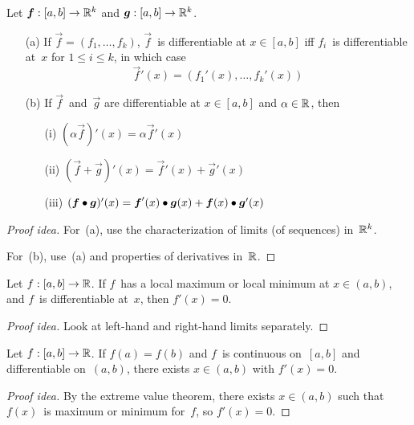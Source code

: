 \begin{thm}[Derivatives in~\(\R^k\)]
Let \(\boldsymbol{f}:[a,b]\to\mathbb{R}^k\) and \(\boldsymbol{g}:[a,b]\to\mathbb{R}^k\).
\begin{enumerate}[itemsep=0pt]
\item[(a)] If \(\vec{f}=(f_1,\ldots,f_k)\), \(\vec{f}\)~is differentiable at \(x\in[a,b]\) iff \(f_i\)~is differentiable at~\(x\) for \(1\le i\le k\), in which case
\[\vec{f}'(x)=(f_1'(x),\ldots,f_k'(x))\]
\item[(b)] If \(\vec{f}\)~and~\(\vec{g}\) are differentiable at \(x\in[a,b]\) and \(\alpha\in\mathbb{R}\), then
\begin{enumerate}[itemsep=0pt]
\item[(i)] \((\alpha\vec{f})'(x)=\alpha\vec{f}'(x)\)
\item[(ii)] \((\vec{f}+\vec{g})'(x)=\vec{f}'(x)+\vec{g}'(x)\)
\item[(iii)] \((\boldsymbol{f}\bullet\boldsymbol{g})'(x)=\boldsymbol{f}'(x)\bullet\boldsymbol{g}(x)+\boldsymbol{f}(x)\bullet\boldsymbol{g}'(x)\)
\end{enumerate}
\end{enumerate}
\end{thm}
\begin{proof}[Proof idea]
For~(a), use the characterization of limits (of sequences) in~\(\R^k\).

For~(b), use~(a) and properties of derivatives in~\(\mathbb{R}\).
\end{proof}

\begin{thm}[Fermat]
Let \(f:[a,b]\to\mathbb{R}\). If \(f\)~has a local maximum or local minimum at \(x\in(a,b)\), and \(f\)~is differentiable at~\(x\), then \(f'(x)=0\).
\end{thm}
\begin{proof}[Proof idea]
Look at left-hand and right-hand limits separately.
\end{proof}
\begin{thm}[Rolle]
Let \(f:[a,b]\to\mathbb{R}\). If \(f(a)=f(b)\) and \(f\)~is continuous on~\([a,b]\) and differentiable on~\((a,b)\), there exists \(x\in(a,b)\) with \(f'(x)=0\).
\end{thm}
\begin{proof}[Proof idea]
By the extreme value theorem, there exists \(x\in(a,b)\) such that \(f(x)\)~is maximum or minimum for~\(f\), so \(f'(x)=0\).
\end{proof}

